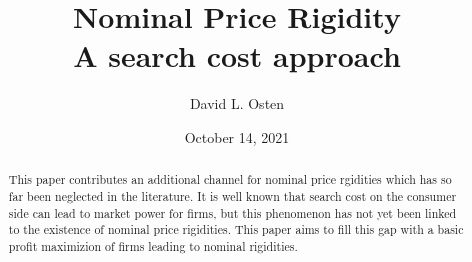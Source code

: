 \documentclass[ProjectDLO]{subfiles}
\begin{document}
\providecommand{\versn}{pdf} %
\ifthenelse{\boolean{Web}}{    %
  \renewcommand{\versn}{Web}     %
  \renewcommand{\rootFromOut}{.} %
}{}  %


\title{Nominal Price Rigidity \\ A search cost approach}

\author{David L. Osten\authNum}



\renewcommand{\forcedate}{October 14, 2021}\date{\forcedate}

\maketitle
\hypertarget{abstract}{}
\begin{abstract}
This paper contributes an additional channel for nominal price rgidities which has so far been neglected in the literature. It is well known that search cost on the consumer side can lead to market power for firms, but this phenomenon has not yet been linked to the existence of nominal price rigidities. This paper aims to fill this gap with a basic profit maximizion of firms leading to nominal rigidities.
\end{abstract}


\hypertarget{links}{}
\end{document}

